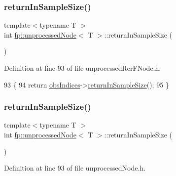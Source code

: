 \subsubsection{\texorpdfstring{return\+In\+Sample\+Size()}{returnInSampleSize()}\hspace{0.1cm}{\footnotesize\ttfamily [1/2]}}
{\footnotesize\ttfamily template$<$typename T $>$ \\
int \hyperlink{classfp_1_1unprocessedNode}{fp\+::unprocessed\+Node}$<$ T $>$\+::return\+In\+Sample\+Size (\begin{DoxyParamCaption}{ }\end{DoxyParamCaption})\hspace{0.3cm}{\ttfamily [inline]}}



Definition at line 93 of file unprocessed\+Rer\+F\+Node.\+h.


\begin{DoxyCode}
93                                                \{
94                     \textcolor{keywordflow}{return} \hyperlink{classfp_1_1unprocessedNode_aba9f03124658f62906fa8ded53cef535}{obsIndices}->\hyperlink{classfp_1_1stratifiedInNodeClassIndices_a596235ffec7250fabd2818d395b39c66}{returnInSampleSize}();
95                 \}
\end{DoxyCode}
\mbox{\label{classfp_1_1unprocessedNode_a5243ac02610f01c6b0df9d5fd6f6f857}} 
\subsubsection{\texorpdfstring{return\+In\+Sample\+Size()}{returnInSampleSize()}\hspace{0.1cm}{\footnotesize\ttfamily [2/2]}}
{\footnotesize\ttfamily template$<$typename T $>$ \\
int \hyperlink{classfp_1_1unprocessedNode}{fp\+::unprocessed\+Node}$<$ T $>$\+::return\+In\+Sample\+Size (\begin{DoxyParamCaption}{ }\end{DoxyParamCaption})\hspace{0.3cm}{\ttfamily [inline]}}



Definition at line 93 of file unprocessed\+Node.\+h.


